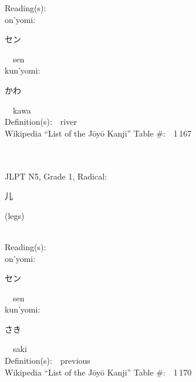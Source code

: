 \begin{multicols}{2}
Reading(s):\ \ \\
{\hspace*{1em}}on'yomi:\ \ \\
{\hspace*{2em}}{\begin{CJK}{UTF8}{min} セン \end{CJK}}\ \ sen\ \ \\
{\hspace*{1em}}kun'yomi:\ \ \\
{\hspace*{2em}}{\begin{CJK}{UTF8}{min} かわ \end{CJK}}\ \ kawa\ \ \\
Definition(s):\ \ river \\
Wikipedia ``List of the J\=oy\=o Kanji'' Table \#:\ \ 1\,167 \\
\ \ \\
{\fontsize{34pt}{40pt}  }\ \ \\  %
{JLPT N5, Grade 1, Radical:\ \ {\begin{CJK}{UTF8}{min} 儿 \end{CJK}} (legs) } \\
Reading(s):\ \ \\
{\hspace*{1em}}on'yomi:\ \ \\
{\hspace*{2em}}{\begin{CJK}{UTF8}{min} セン \end{CJK}}\ \ sen\ \ \\
{\hspace*{1em}}kun'yomi:\ \ \\
{\hspace*{2em}}{\begin{CJK}{UTF8}{min} さき \end{CJK}}\ \ saki\ \ \\
Definition(s):\ \ previous \\
Wikipedia ``List of the J\=oy\=o Kanji'' Table \#:\ \ 1\,170 \\
\ \ \\
{\fontsize{34pt}{40pt}  }\ \ \\  %

\end{multicols}
